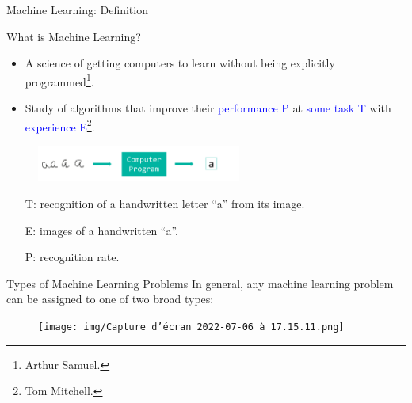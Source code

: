 \documentclass[
  9pt,
  ignorenonframetext,
  aspectratio=169,
  t, dvipsnames]{beamer}
\theoremstyle{definition}
\begin{document}
\begin{frame}{Machine Learning: Definition}
\protect\hypertarget{machine-learning-definition}{}
\begin{block}{What is Machine Learning?}
  \begin{itemize}
    \item A science of getting computers to learn without being explicitly programmed\footnote{Arthur Samuel.}.
    \item Study of algorithms that \alert{improve} their \textcolor{blue}{performance P} at \textcolor{blue}{some task T} with \textcolor{blue}{experience E}\footnote{Tom Mitchell.}.
  \end{itemize}
\end{block}

\begin{figure}

{\centering \includegraphics[width=0.6\textwidth,height=\textheight]{img/ocr.pdf}

}

\end{figure}

\begin{itemize}
  \item[\textcolor{barcolor}{T:}] recognition of a handwritten letter ``a'' from its image.
  \item[\textcolor{barcolor}{E:}] images of a handwritten ``a''.
  \item[\textcolor{barcolor}{P:}] recognition rate.
\end{itemize}
\end{frame}

\begin{frame}{Types of Machine Learning Problems}
\protect\hypertarget{types-of-machine-learning-problems}{}
In general, any machine learning problem can be assigned to one of two
broad types:

\begin{figure}

{\centering \texttt{[image: img/Capture d’écran 2022-07-06 à 17.15.11.png]}

}

\end{figure}
\end{frame}
\end{document}
